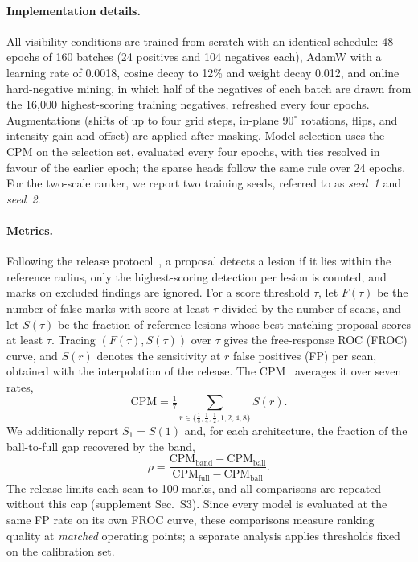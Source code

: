 \paragraph{Implementation details.} All visibility conditions are trained from scratch with an identical schedule: 48 epochs of 160 batches (24 positives and 104 negatives each), AdamW with a learning rate of 0.0018, cosine decay to 12\% and weight decay 0.012, and online hard-negative mining, in which half of the negatives of each batch are drawn from the 16,000 highest-scoring training negatives, refreshed every four epochs. Augmentations (shifts of up to four grid steps, in-plane $90^\circ$ rotations, flips, and intensity gain and offset) are applied after masking. Model selection uses the CPM on the selection set, evaluated every four epochs, with ties resolved in favour of the earlier epoch; the sparse heads follow the same rule over 24 epochs. For the two-scale ranker, we report two training seeds, referred to as \emph{seed~1} and \emph{seed~2}.

\paragraph{Metrics.} Following the release protocol~\cite{setio2017luna16}, a proposal detects a lesion if it lies within the reference radius, only the highest-scoring detection per lesion is counted, and marks on excluded findings are ignored. For a score threshold $\tau$, let $F(\tau)$ be the number of false marks with score at least $\tau$ divided by the number of scans, and let $S(\tau)$ be the fraction of reference lesions whose best matching proposal scores at least $\tau$. Tracing $(F(\tau),S(\tau))$ over $\tau$ gives the free-response ROC (FROC) curve, and $S(r)$ denotes the sensitivity at $r$ false positives (FP) per scan, obtained with the interpolation of the release. The CPM~\cite{niemeijer2011combining,setio2017luna16} averages it over seven rates,
\begin{equation}
\mathrm{CPM}=\tfrac{1}{7}\textstyle\sum_{r\in\{\frac18,\frac14,\frac12,1,2,4,8\}} S(r).
\end{equation}
We additionally report $S_1=S(1)$ and, for each architecture, the fraction of the ball-to-full gap recovered by the band,
\begin{equation}
 \rho=\frac{\mathrm{CPM}_{\text{band}}-\mathrm{CPM}_{\text{ball}}}{\mathrm{CPM}_{\text{full}}-\mathrm{CPM}_{\text{ball}}}.
 \label{eq:recovery}
\end{equation} The release limits each scan to 100 marks, and all comparisons are repeated without this cap (supplement Sec.~S3). Since every model is evaluated at the same FP rate on its own FROC curve, these comparisons measure ranking quality at \emph{matched} operating points; a separate analysis applies thresholds fixed on the calibration set.

